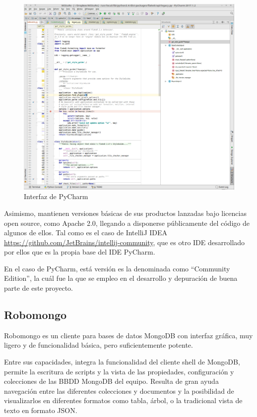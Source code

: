 \begin{figure}[H]
   \centering
   \includegraphics[width=16cm]{img/pycharm}
   \caption{Interfaz de PyCharm }
   \label{figura:pycharm}
\end{figure}



Asimismo, mantienen versiones básicas de sus productos lanzadas bajo licencias open source, como Apache 2.0, llegando a disponerse públicamente del código de algunos de ellos. Tal como es el caso de IntelliJ IDEA \space \url{https://github.com/JetBrains/intellij-community}, que es otro IDE desarrollado por ellos que es la propia base del IDE PyCharm.


En el caso de PyCharm, está versión es la denominada como ``Community Edition'', la cuál fue la que se empleo en el desarrollo y depuración de buena parte de este proyecto.




\subsection{Robomongo}
\label{subsec:robomongo}

Robomongo es un cliente para bases de datos MongoDB con interfaz gráfica, muy ligero y de funcionalidad básica, pero suficientemente potente.


Entre sus capacidades, integra la funcionalidad del cliente shell de MongoDB, permite la escritura de scripts y la vista de las propiedades, configuración y colecciones de las BBDD MongoDB del equipo. Resulta de gran ayuda navegación entre las diferentes colecciones y documentos y la posibilidad de visualizarlos en diferentes formatos como tabla, árbol, o la tradicional vista de texto en formato JSON.


